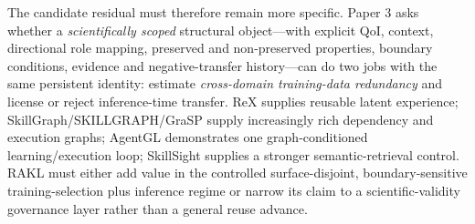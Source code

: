 The candidate residual must therefore remain more specific. Paper 3 asks whether a \emph{scientifically scoped} structural object---with explicit QoI, context, directional role mapping, preserved and non-preserved properties, boundary conditions, evidence and negative-transfer history---can do two jobs with the same persistent identity: estimate \emph{cross-domain training-data redundancy} and license or reject inference-time transfer. ReX supplies reusable latent experience; SkillGraph/SKILLGRAPH/GraSP supply increasingly rich dependency and execution graphs; AgentGL demonstrates one graph-conditioned learning/execution loop; SkillSight supplies a stronger semantic-retrieval control. RAKL must either add value in the controlled surface-disjoint, boundary-sensitive training-selection plus inference regime or narrow its claim to a scientific-validity governance layer rather than a general reuse advance.
